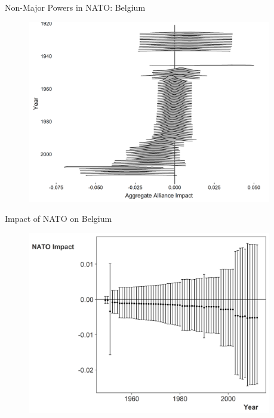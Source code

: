 \documentclass[12pt]{beamer}
\begin{document}

\begin{frame}{Non-Major Powers in NATO: Belgium}


\begin{figure}
	\centering
		\includegraphics[width=0.95\textwidth]{bel-agg-imp.png}
\end{figure}


\end{frame}



\begin{frame}{Impact of NATO on Belgium}


\begin{figure}
	\centering
		\includegraphics[width=0.95\textwidth]{bel-nato-imp.png}
\end{figure}


\end{frame}
\end{document}
